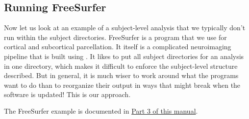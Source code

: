 \subsection{Running FreeSurfer}
Now let us look at an example of a subject-level analysis that we typically don't run within the subject directories. FreeSurfer \citep[see][]{Desikan2006968, Fischl01012004, Fischl2004S69} is a program that we use for cortical and subcortical parcellation. It itself is a complicated neuroimaging pipeline that is built using \maken{}. It likes to put all subject directories for an analysis in one directory, which makes it difficult to enforce the subject-level structure described. But in general, it is much wiser to work around what the programs want to do than to reorganize their output in ways that might break when the software is updated! This is our approach.

The FreeSurfer example is documented in \hyperref[sec:freesurfer]{Part 3 of this manual}. 

